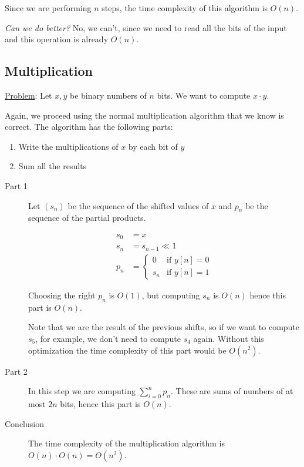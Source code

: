 \documentclass[12pt]{extarticle}
\begin{document}
Since we are performing $n$ steps, the time complexity of this algorithm is $O(n)$.

\textit{Can we do better?} No, we can't, since we need to read all the bits of the input and this operation is already $O(n)$.

\subsection{Multiplication}

\underline{Problem}: Let $x, y$ be binary numbers of $n$ bits. We want to compute $x \cdot y$.

Again, we proceed using the normal multiplication algorithm that we know is correct.
The algorithm has the following parts:
\begin{enumerate}
    \item Write the multiplications of $x$ by each bit of $y$
    \item Sum all the results
\end{enumerate}

\begin{description}
    \item[Part 1]
        Let $(s_n)$ be the sequence of the shifted values of $x$ and $p_n$ be the sequence of the partial products.


        \begin{align*}
            s_0 & = x                         \\
            s_n & = s_{n-1} \ll 1             \\
            p_n & = \begin{cases*}
                        0   & \text{if } y[n] = 0 \\
                        s_n & \text{if } y[n] = 1
                    \end{cases*}
        \end{align*}

        Choosing the right $p_n$ is $O(1)$, but computing $s_n$ is $O(n)$ hence this part is $O(n)$.

        Note that we are  the result of the previous shifts, so if we want to compute $s_5$, for example, we don't need to compute $s_4$ again.
        Without this optimization the time complexity of this part would be $O(n^2)$.

    \item[Part 2]
        In this step we are computing $\sum_{i = 0}^n p_n$.
        These are sums of numbers of at most $2n$ bits, hence this part is $O(n)$.

    \item[Conclusion]
        The time complexity of the multiplication algorithm is $O(n) \cdot O(n) = O(n^2)$.

\end{description}
\end{document}
